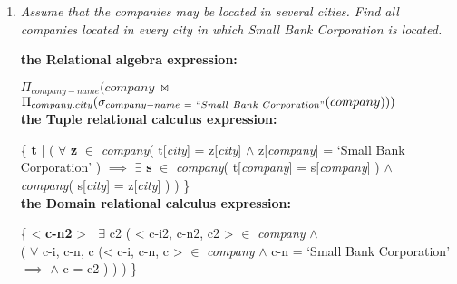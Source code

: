 \documentclass[paper=8.27in:11.69in, 14pt, DIV=calc]{scrartcl}
\begin{document}
\begin{enumerate}[label=\alph*)]
\newpage

\item \textit{Assume that the companies may be located in several cities. Find all companies located in every city in which Small Bank Corporation is located.\\}

\textbf{the Relational algebra expression:\\}

$\Pi_{company-name}(company \ \bowtie $\\
$\Pi_{company.city}(\sigma_{company-name \ = \ ``Small \ Bank \ Corporation"}(company)))$\\

\textbf{the Tuple relational calculus expression:\\}

\{ \textbf{t} | ( $\forall$ \textbf{z} $\in$ \textit{company}( t[\textit{city}] = z[\textit{city}] $\wedge$ z[\textit{company}] = `Small Bank Corporation' ) $\implies$ $\exists$ \textbf{s} $\in$ \textit{company}( t[\textit{company}] = s[\textit{company}] ) $\wedge$ \\ \textit{company}( s[\textit{city}] = z[\textit{city}] ) ) \}\\

\textbf{the Domain relational calculus expression:\\}

\{ < \textbf{c-n2} > | $\exists$ c2 ( < c-i2, c-n2, c2 > $\in$ \textit{company} $\wedge$ \\ ( $\forall$ c-i, c-n, c (< c-i, c-n, c > $\in$ \textit{company} $\wedge$ c-n = `Small Bank Corporation' \\ $\implies$  $\wedge$ c = c2 ) ) ) \}

\end{enumerate}
\end{document}
